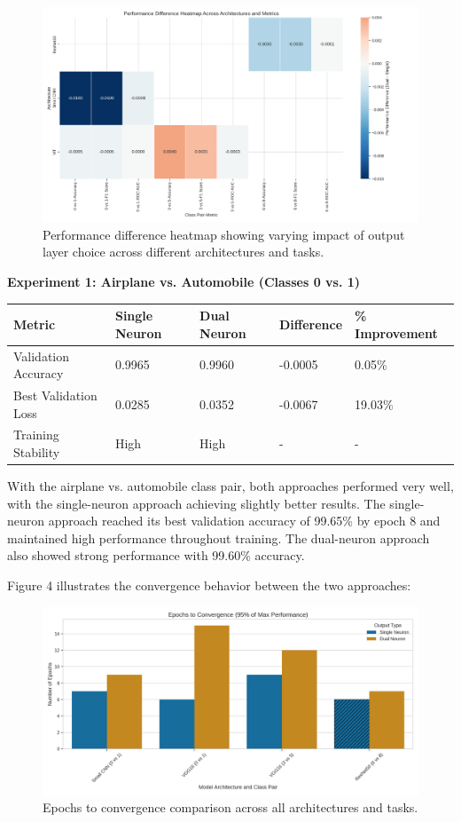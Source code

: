 \documentclass[11pt]{article}
\begin{document}
\begin{figure}[htbp]
\centering
\includegraphics[width=\textwidth]{figures/performance_difference_heatmap.png}
\caption{Performance difference heatmap showing varying impact of output layer choice across different architectures and tasks.}
\end{figure}

\textbf{Experiment 1: Airplane vs. Automobile (Classes 0 vs. 1)}

\begin{tabular}{lllll}
\hline
Metric & Single Neuron & Dual Neuron & Difference & \% Improvement \\
\hline
Validation Accuracy & 0.9965 & 0.9960 & -0.0005 & 0.05\% \\
Best Validation Loss & 0.0285 & 0.0352 & -0.0067 & 19.03\% \\
Training Stability & High & High & - & - \\
\hline
\end{tabular}

With the airplane vs. automobile class pair, both approaches performed very well, with the single-neuron approach achieving slightly better results. The single-neuron approach reached its best validation accuracy of 99.65\% by epoch 8 and maintained high performance throughout training. The dual-neuron approach also showed strong performance with 99.60\% accuracy.

Figure 4 illustrates the convergence behavior between the two approaches:

\begin{figure}[htbp]
\centering
\includegraphics[width=\textwidth]{figures/convergence_rate_comparison.png}
\caption{Epochs to convergence comparison across all architectures and tasks.}
\end{figure}
\end{document}
